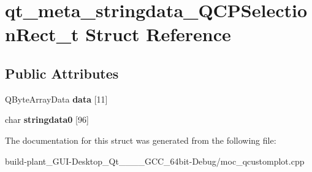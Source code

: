\hypertarget{structqt__meta__stringdata__QCPSelectionRect__t}{}\section{qt\+\_\+meta\+\_\+stringdata\+\_\+\+Q\+C\+P\+Selection\+Rect\+\_\+t Struct Reference}
\label{structqt__meta__stringdata__QCPSelectionRect__t}
\subsection*{Public Attributes}
\begin{DoxyCompactItemize}
\item 
\mbox{\label{structqt__meta__stringdata__QCPSelectionRect__t_aa58583b159c4713d8ea71032fddcc13f}} 
Q\+Byte\+Array\+Data {\bfseries data} \mbox{[}11\mbox{]}
\item 
\mbox{\label{structqt__meta__stringdata__QCPSelectionRect__t_a39a87de1040c403f0ba00fdaedecbb79}} 
char {\bfseries stringdata0} \mbox{[}96\mbox{]}
\end{DoxyCompactItemize}


The documentation for this struct was generated from the following file\+:\begin{DoxyCompactItemize}
\item 
build-\/plant\+\_\+\+G\+U\+I-\/\+Desktop\+\_\+\+Qt\+\_\+\_\+\_\+\_\+\+G\+C\+C\+\_\+64bit-\/\+Debug/moc\+\_\+qcustomplot.\+cpp\end{DoxyCompactItemize}
